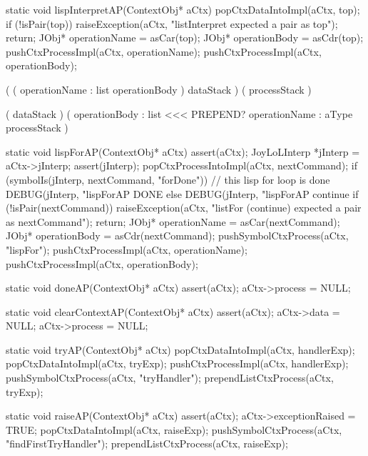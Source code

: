 \stoptyping

\startCCode
static void lispInterpretAP(ContextObj* aCtx) {
  popCtxDataIntoImpl(aCtx, top);
  if (!isPair(top)) {
    raiseException(aCtx,
      "listInterpret expected a pair as top");
    return;
  }
  JObj* operationName = asCar(top);
  JObj* operationBody = asCdr(top);
  pushCtxProcessImpl(aCtx, operationName);
  pushCtxProcessImpl(aCtx, operationBody);
}
\stopCCode

\starttyping

\startWord[lispInterpret]

\preDataStack
  (
    (
      operationName : list
      operationBody
    )
    dataStack 
  )
\preProcessStack
  (
    processStack
  )
\preConditions
\stopPreStack

\postDataStack
  ( dataStack )
\postProcessStack
  (
    operationBody : list <<< PREPEND?
    operationName : aType
    processStack
  )
\postConditions
\stopPostStack

\stopWord

\stoptyping

\startCCode
static void lispForAP(ContextObj* aCtx) {
  assert(aCtx);
  JoyLoLInterp *jInterp = aCtx->jInterp;
  assert(jInterp);
  popCtxProcessIntoImpl(aCtx, nextCommand);
  if (symbolIs(jInterp, nextCommand, "forDone")) {
    // this lisp for loop is done
    DEBUG(jInterp, "lispForAP DONE%
  } else {
    DEBUG(jInterp, "lispForAP continue%
    if (!isPair(nextCommand)) {
      raiseException(aCtx,
        "listFor (continue) expected a pair as nextCommand");
      return;
    }
    JObj* operationName = asCar(nextCommand);
    JObj* operationBody = asCdr(nextCommand);
    pushSymbolCtxProcess(aCtx, "lispFor");
    pushCtxProcessImpl(aCtx, operationName);
    pushCtxProcessImpl(aCtx, operationBody);
  }
}
\stopCCode

\startCCode
static void doneAP(ContextObj* aCtx) {
  assert(aCtx);
  aCtx->process = NULL;
}
\stopCCode

\startCCode
static void clearContextAP(ContextObj* aCtx) {
  assert(aCtx);
  aCtx->data    = NULL;
  aCtx->process = NULL;
}
\stopCCode

\startCCode
static void tryAP(ContextObj* aCtx) {
  popCtxDataIntoImpl(aCtx, handlerExp);
  popCtxDataIntoImpl(aCtx, tryExp);
  pushCtxProcessImpl(aCtx, handlerExp);
  pushSymbolCtxProcess(aCtx, "tryHandler");
  prependListCtxProcess(aCtx, tryExp);
}
\stopCCode

\startCCode
static void raiseAP(ContextObj* aCtx) {
  assert(aCtx);
  aCtx->exceptionRaised = TRUE;
  popCtxDataIntoImpl(aCtx, raiseExp);
  pushSymbolCtxProcess(aCtx, "findFirstTryHandler");
  prependListCtxProcess(aCtx, raiseExp);
}
\stopCCode

